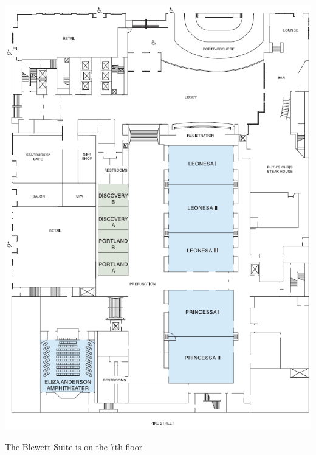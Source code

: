 \renewcommand{\leftheader}{Conference Venue:  Grand Hyatt Seattle}
\renewcommand{\rightheader}{Conference Venue:  Grand Hyatt Seattle}
\noindent
\includegraphics[width=\textwidth]{venue/floorplan1.PNG}
\begin{center}
\Large The Blewett Suite is on the 7th floor
\end{center}

\clearpage

\renewcommand{\leftheader}{}
\renewcommand{\rightheader}{}

